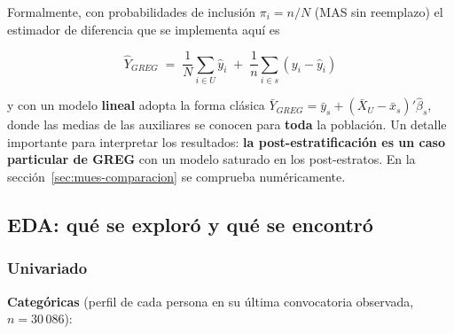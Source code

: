 Formalmente, con probabilidades de inclusión $\pi_i = n/N$ (MAS sin reemplazo)
el estimador de diferencia que se implementa aquí es

\begin{equation}
  \hat{Y}_{GREG} \;=\; \frac{1}{N}\sum_{i\in U}\hat{y}_i
  \;+\; \frac{1}{n}\sum_{i\in s}\left(y_i - \hat{y}_i\right)
  \label{eq:mues-greg}
\end{equation}

y con un modelo \textbf{lineal} adopta la forma clásica
$\bar{Y}_{GREG} = \bar{y}_s + (\bar{X}_U - \bar{x}_s)'\hat{\beta}_s$, donde las
medias de las auxiliares se conocen para \textbf{toda} la población. Un detalle
importante para interpretar los resultados: \textbf{la post-estratificación es
un caso particular de GREG} con un modelo saturado en los post-estratos. En la
sección~\ref{sec:mues-comparacion} se comprueba numéricamente.

\subsection{EDA: qué se exploró y qué se encontró}
\label{sec:mues-eda}

\subsubsection{Univariado}

\textbf{Categóricas} (perfil de cada persona en su última convocatoria
observada, $n = 30\,086$):

